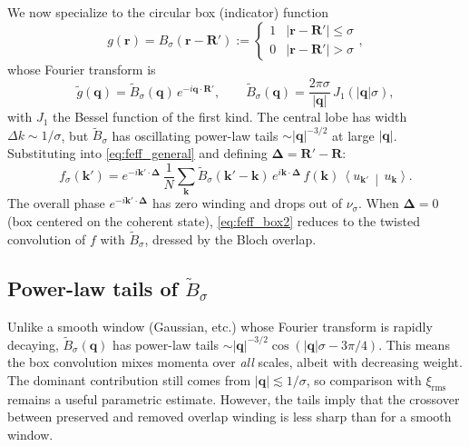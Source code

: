 \documentclass[aps,prb,onecolumn,nofootinbib,superscriptaddress]{revtex4-2}
\newcommand{\mbf}[1]{\mathbf{#1}}
\newcommand{\bs}[1]{\boldsymbol{#1}}
\newcommand{\braket}[2]{\left\langle#1\,\middle|\,#2\right\rangle}
\begin{document}
We now specialize to the circular box (indicator) function
\begin{equation}\label{eq:box_def}
g(\mbf{r}) = B_\sigma(\mbf{r} - \mbf{R}') := \begin{cases} 1 & |\mbf{r} - \mbf{R}'| \leq \sigma \\ 0 & |\mbf{r} - \mbf{R}'| > \sigma \end{cases},
\end{equation}
whose Fourier transform is
\begin{equation}\label{eq:box_FT}
\tilde{g}(\mbf{q}) = \widetilde{B}_\sigma(\mbf{q})\,e^{-i\mbf{q}\cdot\mbf{R}'}, \qquad \widetilde{B}_\sigma(\mbf{q}) = \frac{2\pi\sigma}{|\mbf{q}|}\,J_1(|\mbf{q}|\sigma),
\end{equation}
with $J_1$ the Bessel function of the first kind. The central lobe has width $\Delta k \sim 1/\sigma$, but $\widetilde{B}_\sigma$ has oscillating power-law tails $\sim |\mbf{q}|^{-3/2}$ at large $|\mbf{q}|$. Substituting into \eqref{eq:feff_general} and defining $\bs{\Delta}=\mbf{R}'-\mbf{R}$:
\begin{equation}\label{eq:feff_box2}
\boxed{f_\sigma(\mbf{k}') = e^{-i\mbf{k}'\cdot\bs{\Delta}}\,\frac{1}{N}\sum_{\mbf{k}} \widetilde{B}_\sigma(\mbf{k}'-\mbf{k})\, e^{i\mbf{k}\cdot\bs{\Delta}}\, f(\mbf{k})\,\braket{u_{\mbf{k}'}}{u_{\mbf{k}}}.}
\end{equation}
The overall phase $e^{-i\mbf{k}'\cdot\bs{\Delta}}$ has zero winding and drops out of $\nu_\sigma$. When $\bs{\Delta}=0$ (box centered on the coherent state), \eqref{eq:feff_box2} reduces to the twisted convolution of $f$ with $\widetilde{B}_\sigma$, dressed by the Bloch overlap.

\subsection*{Power-law tails of \texorpdfstring{$\widetilde{B}_\sigma$}{B-sigma}}

Unlike a smooth window (Gaussian, etc.) whose Fourier transform is rapidly decaying, $\widetilde{B}_\sigma(\mbf{q})$ has power-law tails $\sim |\mbf{q}|^{-3/2}\cos(|\mbf{q}|\sigma - 3\pi/4)$. This means the box convolution mixes momenta over \emph{all} scales, albeit with decreasing weight. The dominant contribution still comes from $|\mbf{q}| \lesssim 1/\sigma$, so comparison with $\xi_{\mathrm{rms}}$ remains a useful parametric estimate. However, the tails imply that the crossover between preserved and removed overlap winding is less sharp than for a smooth window.
\end{document}

